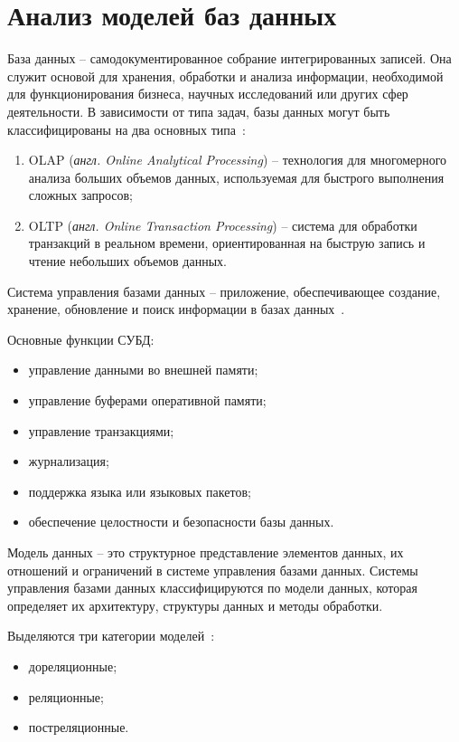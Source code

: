 \section{Анализ моделей баз данных}

База данных -- самодокументированное собрание интегрированных записей. Она служит основой для хранения, обработки и анализа информации, необходимой для функционирования бизнеса, научных исследований или других сфер деятельности. В зависимости от типа задач, базы данных могут быть классифицированы на два основных типа~\cite{lit7, lit8}:
\begin{enumerate}
	\item OLAP (\textit{англ. Online Analytical Processing}) -- технология для многомерного анализа больших объемов данных, используемая для быстрого выполнения сложных запросов;
	\item OLTP (\textit{англ. Online Transaction Processing}) -- система для обработки транзакций в реальном времени, ориентированная на быструю запись и чтение небольших объемов данных.
\end{enumerate}

Система управления базами данных -- приложение, обеспечивающее создание,
хранение, обновление и поиск информации в базах данных~\cite{lit8}.

Основные функции СУБД:
\begin{itemize}[label=--]
	\item управление данными во внешней памяти;
	\item управление буферами оперативной памяти;
	\item управление транзакциями;
	\item журнализация;
	\item поддержка языка или языковых пакетов;
	\item обеспечение целостности и безопасности базы данных.
\end{itemize}

Модель данных -- это структурное представление элементов данных, их отношений и ограничений в системе управления базами данных. Системы управления базами данных  классифицируются по модели данных, которая определяет их архитектуру, структуры данных и методы обработки. 

\newpage

Выделяются три категории моделей~\cite{lit7, lit8}: 
\begin{itemize}[label=--]
	\item дореляционные;
	\item реляционные;
	\item постреляционные.
\end{itemize}

